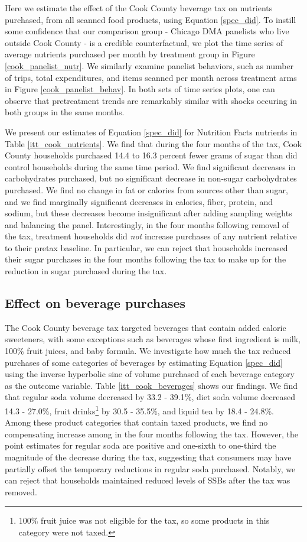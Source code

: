 \documentclass[12pt]{article}
\begin{document}
Here we estimate the effect of the Cook County beverage tax on nutrients purchased, from all scanned food products, using Equation \ref{spec_did}. To instill some confidence that our comparison group - Chicago DMA panelists who live outside Cook County - is a credible counterfactual, we plot the time series of average nutrients purchased per month by treatment group in Figure \ref{cook_panelist_nutr}. We similarly examine panelist behaviors, such as number of trips, total expenditures, and items scanned per month across treatment arms in Figure \ref{cook_panelist_behav}. In both sets of time series plots, one can observe that pretreatment trends are remarkably similar with shocks occuring in both groups in the same months.

We present our estimates of Equation \ref{spec_did} for Nutrition Facts nutrients in Table \ref{itt_cook_nutrients}. We find that during the four months of the tax, Cook County households purchased 14.4 to 16.3 percent fewer grams of sugar than did control households during the same time period. We find significant decreases in carbohydrates purchased, but no significant decrease in non-sugar carbohydrates purchased. We find no change in fat or calories from sources other than sugar, and we find marginally significant decreases in calories, fiber, protein, and sodium, but these decreases become insignificant after adding sampling weights and balancing the panel. Interestingly, in the four months following removal of the tax, treatment households did \textit{not} increase purchases of any nutrient relative to their pretax baseline. In particular, we can reject that households increased their sugar purchases in the four months following the tax to make up for the reduction in sugar purchased during the tax.

\subsection{Effect on beverage purchases}

The Cook County beverage tax targeted beverages that contain added caloric sweeteners, with some exceptions such as beverages whose first ingredient is milk, 100\% fruit juices, and baby formula. We investigate how much the tax reduced purchases of some categories of beverages by estimating Equation \ref{spec_did} using the inverse hyperbolic sine of volume purchased of each beverage category as the outcome variable. Table \ref{itt_cook_beverages} shows our findings. We find that regular soda volume decreased by 33.2 - 39.1\%, diet soda volume decreased 14.3 - 27.0\%, fruit drinks\footnote{100\% fruit juice was not eligible for the tax, so some products in this category were not taxed.} by 30.5 - 35.5\%, and liquid tea by 18.4 - 24.8\%. Among these product categories that contain taxed products, we find no compensating increase among in the four months following the tax. However, the point estimates for regular soda are positive and one-sixth to one-third the magnitude of the decrease during the tax, suggesting that consumers may have partially offset the temporary reductions in regular soda purchased. Notably, we can reject that households maintained reduced levels of SSBs after the tax was removed.
\end{document}
